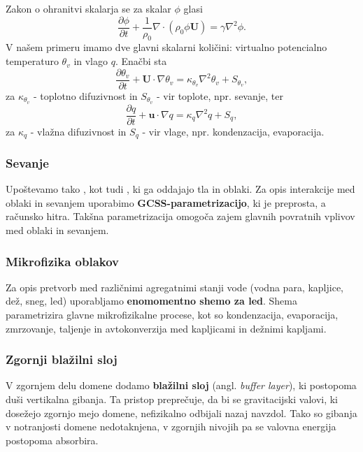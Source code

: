 \documentclass[mat2, tisk]{fmfdelo}
\begin{document}
\noindent
Zakon o ohranitvi skalarja se za skalar $\phi$ glasi
\begin{equation*}
\frac{\partial \phi}{\partial t} + \frac{1}{\rho_0}\nabla \cdot (\rho_0 \phi\textbf{U}) = \gamma \nabla^2 \phi.
\end{equation*}
V našem primeru imamo dve glavni skalarni količini: virtualno potencialno
temperaturo $\theta_v$ in vlago $q$. Enačbi sta 
\begin{equation*}
  \frac{\partial \theta_v}{\partial t} + \mathbf{U}\cdot\nabla \theta_v
   = \kappa_{\theta_v} \nabla^2 \theta_v + S_{\theta_v}, 
\end{equation*}
za $\kappa_{\theta_v}$ - toplotno difuzivnost in $S_{\theta_v}$ - vir toplote, npr. sevanje, 
ter 
\begin{equation*}
  \frac{\partial q}{\partial t} + \mathbf{u}\cdot\nabla q
   = \kappa_q \nabla^2 q + S_q,
\end{equation*}
za $\kappa_q$ - vlažna difuzivnost in $S_q$ - vir vlage, npr. kondenzacija, evaporacija.

\subsubsection{Sevanje}

Upoštevamo tako , kot tudi , ki ga oddajajo tla in oblaki. 
Za opis interakcije med oblaki in sevanjem uporabimo \textbf{GCSS-parametrizacijo}\cite{krueger2016gcss}, ki je preprosta, a računsko hitra. 
Takšna parametrizacija omogoča zajem glavnih povratnih vplivov med oblaki in sevanjem.

\subsubsection{Mikrofizika oblakov}

Za opis pretvorb med različnimi agregatnimi stanji vode 
(vodna para, kapljice, dež, sneg, led) uporabljamo 
\textbf{enomomentno shemo za led}\cite{tomita2008microphysics}. Shema parametrizira glavne 
mikrofizikalne procese, kot so kondenzacija, evaporacija, zmrzovanje, 
taljenje in avtokonverzija med kapljicami in dežnimi kapljami.

\subsubsection{Zgornji blažilni sloj}

V zgornjem delu domene dodamo \textbf{blažilni sloj} (angl. \emph{buffer layer}),
ki postopoma duši vertikalna gibanja. Ta pristop preprečuje, da bi se 
gravitacijski valovi, ki dosežejo zgornjo mejo domene, nefizikalno 
odbijali nazaj navzdol. Tako so gibanja v notranjosti domene 
nedotaknjena, v zgornjih nivojih pa se valovna energija postopoma 
absorbira.
\end{document}
